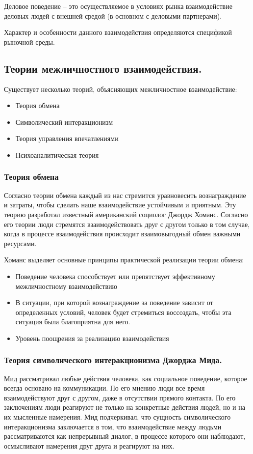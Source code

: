 Деловое поведение – это осуществляемое в условиях рынка взаимодействие деловых людей с внешней средой (в основном с деловыми партнерами).

Характер и особенности данного взаимодействия определяются спецификой рыночной среды.

\subsection{Теории межличностного взаимодействия.}

Существует несколько теорий, объясняющих межличностное взаимодействие:
\begin{itemize}
    \item Теория обмена
    \item Символический интеракционизм
    \item Теория управления впечатлениями
    \item Психоаналитическая теория
\end{itemize}

\subsubsection{Теория обмена}
Согласно теории обмена каждый из нас стремится уравновесить вознаграждение и  затраты, чтобы сделать наше взаимодействие устойчивым и приятным.
Эту теорию разработал известный американский социолог Джордж Хоманс.
Согласно его теории люди стремятся взаимодействовать друг с другом только в том случае, когда в процессе взаимодействия происходит взаимовыгодный обмен важными ресурсами.

Хоманс выделяет основные принципы практической реализации теории обмена:
\begin{itemize}
    \item Поведение человека способствует или препятствует эффективному межличностному взаимодействию 
    \item В ситуации, при которой вознаграждение за поведение зависит от определенных условий, человек будет стремиться воссоздать, чтобы эта ситуация была благоприятна для него.
    \item Уровень поощрения за реализацию взаимодействия
\end{itemize}

\subsubsection{Теория символического интеракционизма Джорджа Мида.}
Мид рассматривал любые действия человека, как социальное поведение, которое всегда основано на коммуникации. По его мнению люди все время взаимодействуют друг с другом, даже в отсутствии прямого контакта.
По его заключениям люди реагируют не только на конкретные действия людей, но и на их мысленные намерения.
Мид подчеркивал, что сущность символического интеракционизма заключается в том, что взаимодействие между людьми рассматриваются как непрерывный диалог, в процессе которого они наблюдают, осмысливают намерения друг друга и реагируют на них.

